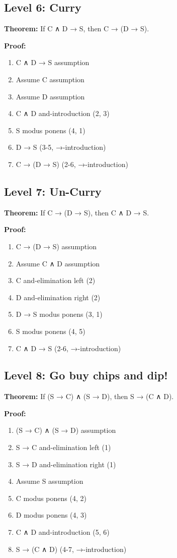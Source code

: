 \documentclass{article}
\theoremstyle{theorem}
\theoremstyle{definition}
\theoremstyle{remark}
\begin{document}
\subsection{Level 6: Curry}
\textbf{Theorem:} If C ∧ D → S, then C → (D → S).

\textbf{Proof:}
\begin{enumerate}
    \item C ∧ D → S \hfill assumption
    \item Assume C \hfill assumption
    \item Assume D \hfill assumption
    \item C ∧ D \hfill and-introduction (2, 3)
    \item S \hfill modus ponens (4, 1)
    \item D → S \hfill (3-5, →-introduction)
    \item C → (D → S) \hfill (2-6, →-introduction)
\end{enumerate}

\subsection{Level 7: Un-Curry}
\textbf{Theorem:} If C → (D → S), then C ∧ D → S.

\textbf{Proof:}
\begin{enumerate}
    \item C → (D → S) \hfill assumption
    \item Assume C ∧ D \hfill assumption
    \item C \hfill and-elimination left (2)
    \item D \hfill and-elimination right (2)
    \item D → S \hfill modus ponens (3, 1)
    \item S \hfill modus ponens (4, 5)
    \item C ∧ D → S \hfill (2-6, →-introduction)
\end{enumerate}

\subsection{Level 8: Go buy chips and dip!}
\textbf{Theorem:} If (S → C) ∧ (S → D), then S → (C ∧ D).

\textbf{Proof:}
\begin{enumerate}
    \item (S → C) ∧ (S → D) \hfill assumption
    \item S → C \hfill and-elimination left (1)
    \item S → D \hfill and-elimination right (1)
    \item Assume S \hfill assumption
    \item C \hfill modus ponens (4, 2)
    \item D \hfill modus ponens (4, 3)
    \item C ∧ D \hfill and-introduction (5, 6)
    \item S → (C ∧ D) \hfill (4-7, →-introduction)
\end{enumerate}
\end{document}
